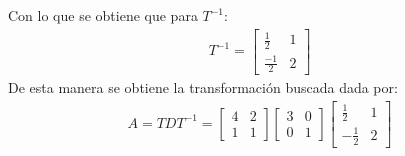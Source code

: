 \documentclass[
  11pt,
  letterpaper,
   addpoints,
   answers
  ]{exam}
\begin{document}
\begin{questions}
\begin{solution}
    Con lo que se obtiene que para \( T^{-1} \):
    \begin{align}
        T^{-1} = \begin{bmatrix}
            \frac{1}{2} & 1\\
            \frac{-1}{2} & 2
        \end{bmatrix}
    \end{align}
    De esta manera se obtiene la transformación buscada dada por:
    \begin{align}
        A = T D T^{-1} = \begin{bmatrix}
            4 & 2\\
            1 & 1
        \end{bmatrix}
        \begin{bmatrix}
            3 & 0\\
            0 & 1
        \end{bmatrix}
        \begin{bmatrix}
            \frac{1}{2} & 1\\
            -\frac{1}{2} & 2
        \end{bmatrix}
    \end{align}

\end{solution}

\end{questions}
\end{document}
